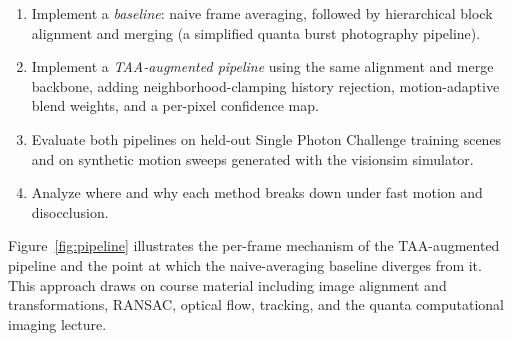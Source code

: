 \documentclass[10pt,twocolumn]{article}
\begin{document}
\begin{enumerate}[leftmargin=1.4em,itemsep=2pt,topsep=2pt]
  \item Implement a \textit{baseline}: naive frame averaging, followed by hierarchical block alignment and merging (a simplified quanta burst photography pipeline).
  \item Implement a \textit{TAA-augmented pipeline} using the same alignment and merge backbone, adding neighborhood-clamping history rejection, motion-adaptive blend weights, and a per-pixel confidence map.
  \item Evaluate both pipelines on held-out Single Photon Challenge training scenes and on synthetic motion sweeps generated with the visionsim simulator.
  \item Analyze where and why each method breaks down under fast motion and disocclusion.
\end{enumerate}

Figure~\ref{fig:pipeline} illustrates the per-frame mechanism of the TAA-augmented pipeline and the point at which the naive-averaging baseline diverges from it. This approach draws on course material including image alignment and transformations, RANSAC, optical flow, tracking, and the quanta computational imaging lecture.
\end{document}
